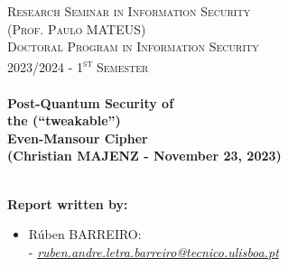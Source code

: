 \documentclass[12pt]{article}
\begin{document}
\begin{titlepage}
\begin{figure}[H]
\begin{minipage}{.5\textwidth}
        \end{minipage}
    \end{figure}
    \vspace{-1cm}
    \textsc{\Large Research Seminar in Information Security}\\[0.5cm] %
    \textsc{(Prof. Paulo \uppercase{Mateus})}\\[0.5cm]
    \textsc{Doctoral Program in Information Security}\\[0.5cm] %
    \textsc{\large 2023/2024 - 1\textsuperscript{st} Semester}\\[0.5cm] %
    
    
    \HRule \\[0.3cm]
        { \huge \bfseries Post-Quantum Security of \\  the (``tweakable'') \\ Even-Mansour Cipher \\ \vspace{0.5cm} \Large (Christian \textsc{\uppercase{Majenz}} - November 23, 2023)}\\[0.4cm] %
    \HRule \\[1cm]
     
    
    \begin{minipage}{0.75\textwidth}
    
        \begin{flushleft} \large
            \textbf{Report written by:}\\
            \begin{itemize}
                \vspace{-0.1cm}
                \item \normalsize{Rúben \textsc{\uppercase{Barreiro}}:\\
                - \href{mailto:ruben.andre.letra.barreiro@tecnico.ulisboa.pt}{\emph{ruben.andre.letra.barreiro@tecnico.ulisboa.pt}}}
            \end{itemize}
        \end{flushleft}
    

\end{minipage}
\end{titlepage}
\end{document}
